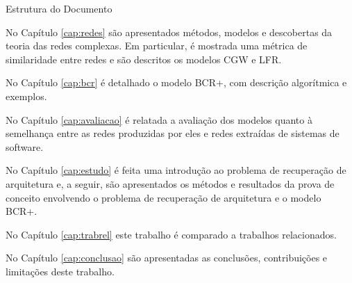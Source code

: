 \begin{section}{Estrutura do Documento}
	
	No Capítulo \ref{cap:redes} são apresentados métodos, modelos e descobertas da teoria das redes complexas. Em particular, é mostrada uma métrica de similaridade entre redes e são descritos os modelos CGW e LFR.
	
	No Capítulo \ref{cap:bcr} é detalhado o modelo BCR+, com descrição algorítmica e exemplos.
	
	No Capítulo \ref{cap:avaliacao} é relatada a avaliação dos modelos quanto à semelhança entre as redes produzidas por eles e redes extraídas de sistemas de software.
	
	No Capítulo \ref{cap:estudo} é feita uma introdução ao problema de recuperação de arquitetura e, a seguir, são apresentados os métodos e resultados da prova de conceito envolvendo o problema de recuperação de arquitetura e o modelo BCR+.
	
	No Capítulo \ref{cap:trabrel} este trabalho é comparado a trabalhos relacionados. 
	
	No Capítulo \ref{cap:conclusao} são apresentadas as conclusões, contribuições e limitações deste trabalho.
	
\end{section}
